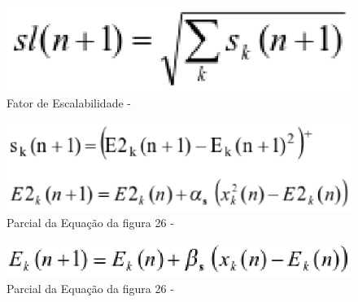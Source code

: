 \begin{figure}[!h]
\centering
\includegraphics[keepaspectratio=true,scale=0.65]
{figuras/sl.eps}
\caption{Fator de Escalabilidade - }
\label{data_titatic}
\end{figure}

\begin{figure}[!h]
\centering
\includegraphics[keepaspectratio=true,scale=0.65]
{figuras/sk.eps}
\caption{Parcial da Equação da figura 26 - }
\label{data_titatic}
\end{figure}

\begin{figure}[!h]
\centering
\includegraphics[keepaspectratio=true,scale=0.65]
{figuras/ek.eps}
\caption{Parcial da Equação da figura 26 - }
\label{data_titatic}
\end{figure}

























